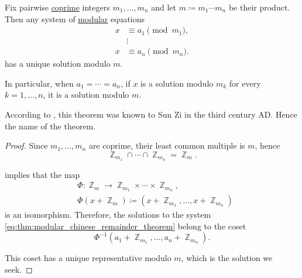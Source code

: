\begin{theorem}\label{thm:modular_chinese_remainder_theorem}
  Fix pairwise \hyperref[def:coprime_numbers]{coprime} integers \( m_1, \ldots, m_n \) and let \( m \coloneqq m_1 \cdots m_n \) be their product. Then any system of \hyperref[con:modular_arithmetic]{modular} equations
  \begin{equation}\label{eq:thm:modular_chinese_remainder_theorem}
    \begin{aligned}
      x &\equiv a_1 \pmod {m_1}, \\
        &\vdots \\
      x &\equiv a_n \pmod {m_n}.
    \end{aligned}
  \end{equation}
  has a unique solution modulo \( m \).

  In particular, when \( a_1 = \cdots = a_n \), if \( x \) is a solution modulo \( m_k \) for every \( k = 1, \ldots, n \), it is a solution modulo \( m \).
\end{theorem}
\begin{comments}
  \item According to \textcite[\S 5.2]{Stillwell2010MathHistory}, this theorem was known to Sun Zi in the third century AD. Hence the name of the theorem.
\end{comments}
\begin{proof}
  Since \( m_1, \ldots, m_n \) are coprime, their least common multiple is \( m \), hence
  \begin{equation*}
    \BbbZ_{m_1} \cap \cdots \cap \BbbZ_{m_n} = \BbbZ_m.
  \end{equation*}

   implies that the map
  \begin{equation*}
    \begin{aligned}
      &\Phi: \BbbZ_m \to \BbbZ_{m_1} \times \cdots \times \BbbZ_{m_n}, \\
      &\Phi(x + \BbbZ_m) \coloneqq (x + \BbbZ_{m_1}, \ldots, x + \BbbZ_{m_n})
    \end{aligned}
  \end{equation*}
  is an isomorphism. Therefore, the solutions to the system \eqref{eq:thm:modular_chinese_remainder_theorem} belong to the coset
  \begin{equation*}
    \Phi^{-1}(a_1 + \BbbZ_{m_1}, \ldots, a_n + \BbbZ_{m_n}).
  \end{equation*}

  This coset has a unique representative modulo \( m \), which is the solution we seek.
\end{proof}

